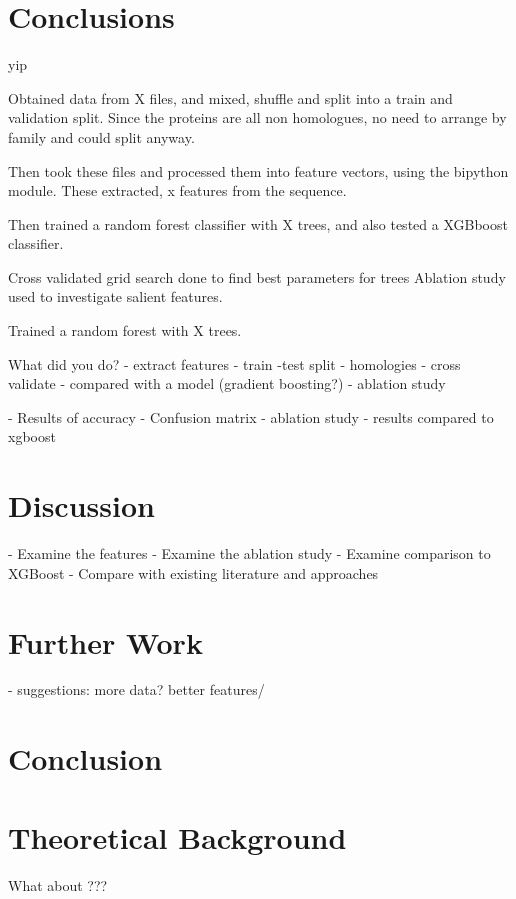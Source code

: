 \documentclass{bioinfo}
\begin{document}
\section{Conclusions}


\newpage
yip
\newpage

Obtained data from X files, and mixed, shuffle and split into a train and validation split. Since the proteins are all non homologues, no need to arrange by family and could split anyway. 

Then took these files and processed them into feature vectors, using the bipython module. These extracted, x features from the sequence. 

Then trained a random forest classifier with X trees, and also tested a XGBboost classifier.

Cross validated grid search done to find best parameters for trees
Ablation study used to investigate salient features.

Trained a random forest with X trees. 

What did you do?
    - extract features
    - train -test split - homologies
    - cross validate
    - compared with a model (gradient boosting?)
    - ablation study



    - Results of accuracy
    - Confusion matrix
    - ablation study
    - results compared to xgboost
\section{Discussion}
   - Examine the features
   - Examine the ablation study
   - Examine comparison to XGBoost
   - Compare with existing literature and approaches



\section{Further Work}
    - suggestions: more data? better features/

\section{Conclusion}

\section{Theoretical Background}

What about ???
\end{document}
